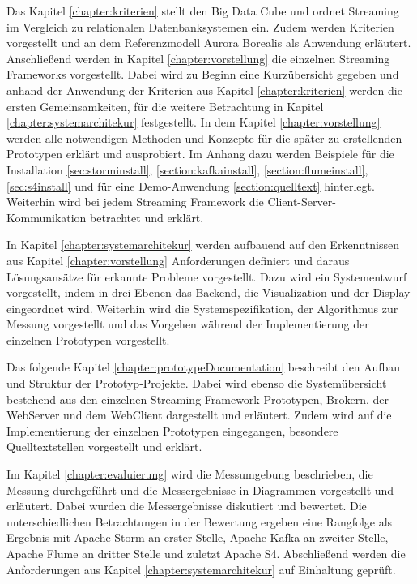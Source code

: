 Das Kapitel \ref{chapter:kriterien} stellt den Big Data Cube und ordnet Streaming im Vergleich zu relationalen Datenbanksystemen ein. Zudem werden Kriterien vorgestellt und an dem Referenzmodell Aurora Borealis als Anwendung erläutert. Anschließend werden in Kapitel \ref{chapter:vorstellung} die einzelnen Streaming Frameworks vorgestellt. Dabei wird zu Beginn eine Kurzübersicht gegeben und anhand der Anwendung der Kriterien aus Kapitel \ref{chapter:kriterien} werden die ersten Gemeinsamkeiten, für die weitere Betrachtung in Kapitel \ref{chapter:systemarchitekur} festgestellt. In dem Kapitel \ref{chapter:vorstellung} werden alle notwendigen Methoden und Konzepte für die später zu erstellenden Prototypen erklärt und ausprobiert. Im Anhang dazu werden Beispiele für die Installation \ref{sec:storminstall}, \ref{section:kafkainstall}, \ref{section:flumeinstall}, \ref{sec:s4install} und für eine Demo-Anwendung \ref{section:quelltext} hinterlegt. Weiterhin wird bei jedem Streaming Framework die Client-Server-Kommunikation betrachtet und erklärt.

In Kapitel \ref{chapter:systemarchitekur} werden aufbauend auf den Erkenntnissen aus Kapitel \ref{chapter:vorstellung} Anforderungen definiert und daraus Lösungsansätze für erkannte Probleme vorgestellt. Dazu wird ein Systementwurf vorgestellt, indem in drei Ebenen das Backend, die Visualization und der Display eingeordnet wird. Weiterhin wird die Systemspezifikation, der Algorithmus zur Messung vorgestellt und das Vorgehen während der Implementierung der einzelnen Prototypen vorgestellt.

Das folgende Kapitel \ref{chapter:prototypeDocumentation} beschreibt den Aufbau und Struktur der Prototyp-Projekte. Dabei wird ebenso die Systemübersicht bestehend aus den einzelnen Streaming Framework Prototypen, Brokern, der WebServer und dem WebClient dargestellt und erläutert. Zudem wird auf die Implementierung der einzelnen Prototypen eingegangen, besondere Quelltextstellen vorgestellt und erklärt.

Im Kapitel \ref{chapter:evaluierung} wird die Messumgebung beschrieben, die Messung durchgeführt und die Messergebnisse in Diagrammen vorgestellt und erläutert. Dabei wurden die Messergebnisse diskutiert und bewertet. Die unterschiedlichen Betrachtungen in der Bewertung ergeben eine Rangfolge als Ergebnis mit Apache Storm an erster Stelle, Apache Kafka an zweiter Stelle, Apache Flume an dritter Stelle und zuletzt Apache S4. Abschließend werden die Anforderungen aus Kapitel \ref{chapter:systemarchitekur} auf Einhaltung geprüft.

